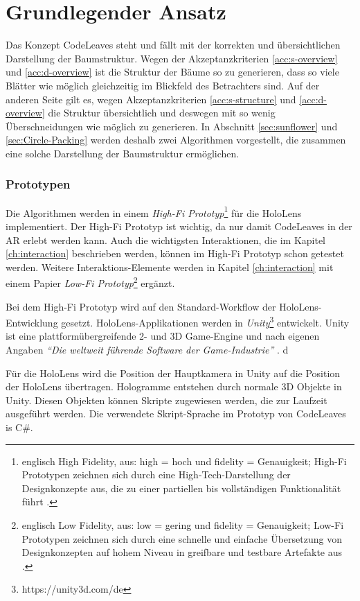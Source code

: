 \section{Grundlegender Ansatz}

Das Konzept CodeLeaves steht und fällt mit der korrekten und übersichtlichen Darstellung der Baumstruktur. Wegen der Akzeptanzkriterien \ref{acc:s-overview} und \ref{acc:d-overview} ist die Struktur der Bäume so zu generieren, dass so viele Blätter wie möglich gleichzeitig im Blickfeld des Betrachters sind. Auf der anderen Seite gilt es, wegen Akzeptanzkriterien \ref{acc:s-structure} und \ref{acc:d-overview} die Struktur übersichtlich und deswegen mit so wenig Überschneidungen wie möglich zu generieren. In Abschnitt \ref{sec:sunflower} und \ref{sec:Circle-Packing} werden deshalb zwei Algorithmen vorgestellt, die zusammen eine solche Darstellung der Baumstruktur ermöglichen.

\subsubsection*{Prototypen}

Die Algorithmen werden in einem \textit{High-Fi Prototyp}\footnote{englisch High Fidelity, aus: high = hoch und fidelity = Genauigkeit; High-Fi Prototypen zeichnen sich durch eine High-Tech-Darstellung der Designkonzepte aus, die zu einer partiellen bis vollständigen Funktionalität führt \cite{egger2000fi}.} für die HoloLens implementiert. Der High-Fi Prototyp ist wichtig, da nur damit CodeLeaves in der AR erlebt werden kann. Auch die wichtigsten Interaktionen, die im Kapitel \ref{ch:interaction} beschrieben werden, können im High-Fi Prototyp schon getestet werden. Weitere Interaktions-Elemente werden in Kapitel \ref{ch:interaction} mit einem Papier \textit{Low-Fi Prototyp}\footnote{englisch Low Fidelity, aus: low = gering und fidelity = Genauigkeit; Low-Fi Prototypen zeichnen sich durch eine schnelle und einfache Übersetzung von Designkonzepten auf hohem Niveau in greifbare und testbare Artefakte aus \cite{egger2000fi}.} ergänzt.

Bei dem High-Fi Prototyp wird auf den Standard-Workflow der HoloLens-Entwicklung gesetzt. HoloLens-Applikationen werden in \textit{Unity}\footnote{https://unity3d.com/de} entwickelt. Unity ist eine platt\-form\-über\-grei\-fen\-de 2- und 3D Game-Engine und nach eigenen Angaben \textit{"`Die weltweit führende Software der Game-Industrie"'} \cite{unity2017public}. d

Für die HoloLens wird die Position der Hauptkamera in Unity auf die Position der HoloLens übertragen. Hologramme entstehen durch normale 3D Objekte in Unity. Diesen Objekten können Skripte zugewiesen werden, die zur Laufzeit ausgeführt werden. Die verwendete Skript-Sprache im Prototyp von CodeLeaves is C\#.

